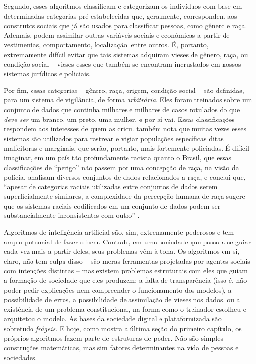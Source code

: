 Segundo, esses algoritmos classificam e categorizam os indivíduos com base em determinadas categorias pré-estabelecidas que, geralmente, correspondem aos construtos sociais que já são usados para classificar pessoas, como gênero e raça.
Ademais, podem assimilar outras variáveis sociais e econômicas a partir de vestimentas, comportamento, localização, entre outros.
É, portanto, extremamente difícil evitar que tais sistemas adquiram vieses de gênero, raça, ou condição social -- vieses esses que também se encontram incrustados em nossos sistemas jurídicos e policiais.

Por fim, essas categorias -- gênero, raça, origem, condição social -- são definidas, para um sistema de vigilância, de forma \textit{arbitrária}.
Eles foram treinados sobre um conjunto de dados que continha milhares e milhares de casos rotulados do que \textit{deve ser} um branco, um preto, uma mulher, e por aí vai.
Essas classificações respondem aos interesses de quem as criou.
\textcite{dubbeld_observing_2003} também nota que muitas vezes esses sistemas são utilizados para rastrear e vigiar populações específicas ditas malfeitoras e marginais, que serão, portanto, mais fortemente policiadas.
É difícil imaginar, em um país tão profundamente racista quanto o Brasil, que essas classificações de ``perigo'' não passem por uma concepção de raça, na visão da polícia.
\textcite{khan_one_2021} analisam diversos conjuntos de dados relacionados a raça, e conclui que, ``apesar de categorias raciais utilizadas entre conjuntos de dados serem superficialmente similares, a complexidade da percepção humana de raça sugere que os sistemas raciais codificados em um conjunto de dados podem ser substancialmente inconsistentes com outro'' \cite[p.~587, tradução~própria]{khan_one_2021}.

Algoritmos de inteligência artificial são, sim, extremamente poderosos e tem amplo potencial de fazer o bem.
Contudo, em uma sociedade que passa a se guiar cada vez mais a partir deles, seus problemas vêm à tona.
Os algoritmos em si, claro, não tem culpa disso -- são meras ferramentas projetadas por agentes sociais com intenções distintas -- mas existem problemas estruturais com eles que guiam a formação de sociedade que eles produzem: a falta de transparência (isso é, não poder pedir explicações nem compreender o funcionamento dos modelos), a possibilidade de erros, a possibilidade de assimilação de vieses nos dados, ou a existência de um problema constitucional, na forma como o treinador escolheu e arquitetou o modelo.
As bases da sociedade digital e plataformizada são sobretudo \textit{frágeis}.
E hoje, como mostra a última seção do primeiro capítulo, os próprios algoritmos fazem parte de estruturas de poder.
Não são simples construções matemáticas, mas sim fatores determinantes na vida de pessoas e sociedades.

